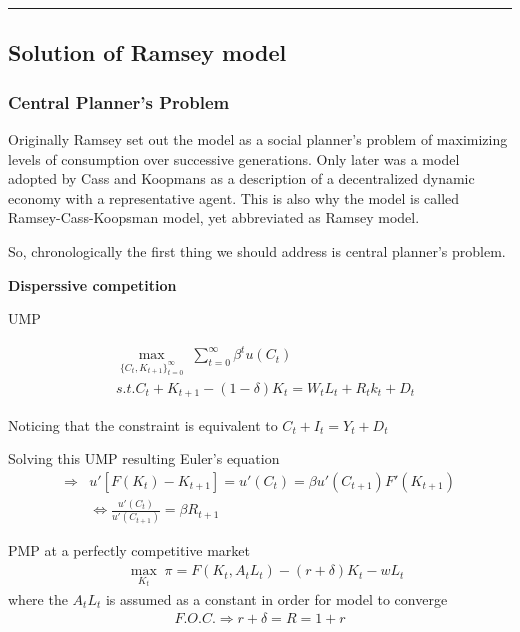 \documentclass{article}
\newcommand*\sepline{%
  \begin{center}
    \rule[1ex]{.5\textwidth}{.5pt}
  \end{center}}
\begin{document}
\sepline
\subsection{Solution of Ramsey model}

\subsubsection{Central Planner's
Problem}\label{central-planners-problem}

Originally Ramsey set out the model as a social planner's problem of
maximizing levels of consumption over successive generations. Only later was a model adopted by Cass and Koopmans as a description of a
decentralized dynamic economy with a representative agent. This is also why the model is called Ramsey-Cass-Koopsman model, yet abbreviated as Ramsey model.

So, chronologically the first thing we should address is central
planner's problem.

\textbf{Disperssive competition} 

UMP

\begin{equation}
\begin{split}
  &\max_{\{C_{t},K_{t+1}\}_{t=0}^{\infty}} \; \sum\limits_{t=0}^{\infty} \beta^{t}u(C_{t})
  \\& s.t.  C_{t}+K_{t+1}-(1-\delta)K_{t}=W_t L_{t}+R_t k_{t}+D_{t}
\end{split}
\end{equation}

Noticing that the constraint is equivalent to $C_{t}+I_{t}=Y_{t}+D_{t}$

Solving this UMP resulting Euler's equation 
\begin{equation}
\begin{split}
  \Rightarrow & u'[F(K_{t})-K_{t+1}]=u'(C_{t})=\beta u'(C_{t+1})F'(K_{t+1})\\
  &\iff \frac{u'(C_{t})}{u'(C_{t+1})}=\beta R_{t+1}
\end{split}
\end{equation}

PMP at a perfectly competitive market
\begin{align}
&\mathop{max}_{K_{t}} \; \pi=F(K_{t},A_{t}L_{t})-(r+\delta)K_{t}-w L_{t}
\end{align}
where the $A_{t}L_{t}$ is assumed as a constant in order for model to converge
\begin{align}
F.O.C. \Rightarrow r+\delta=R=1+r
\end{align}
\end{document}
